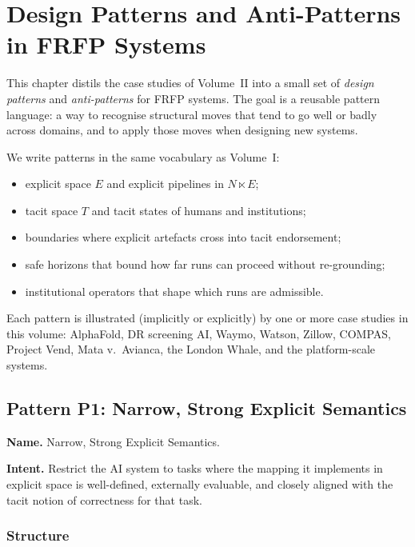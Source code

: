 \chapter{Design Patterns and Anti-Patterns in FRFP Systems}
\label{ch:frfp-patterns}

This chapter distils the case studies of Volume~II into a small set of
\emph{design patterns} and \emph{anti-patterns} for FRFP systems.
The goal is a reusable pattern language:
a way to recognise structural moves that tend to go well or badly across
domains, and to apply those moves when designing new systems.

We write patterns in the same vocabulary as Volume~I:

\begin{itemize}
  \item explicit space \(E\) and explicit pipelines in \(N \ltimes E\);
  \item tacit space \(T\) and tacit states of humans and institutions;
  \item boundaries where explicit artefacts cross into tacit endorsement;
  \item safe horizons that bound how far runs can proceed without
        re-grounding;
  \item institutional operators that shape which runs are admissible.
\end{itemize}

Each pattern is illustrated (implicitly or explicitly) by one or more
case studies in this volume:
AlphaFold, DR screening AI, Waymo, Watson, Zillow, COMPAS, Project Vend,
Mata v.\ Avianca, the London Whale, and the platform-scale systems.

\section{Pattern P1: Narrow, Strong Explicit Semantics}
\label{pattern:p1}

\textbf{Name.} Narrow, Strong Explicit Semantics.

\textbf{Intent.} Restrict the AI system to tasks where the mapping it
implements in explicit space is well-defined, externally evaluable, and
closely aligned with the tacit notion of correctness for that task.

\subsection*{Structure}

